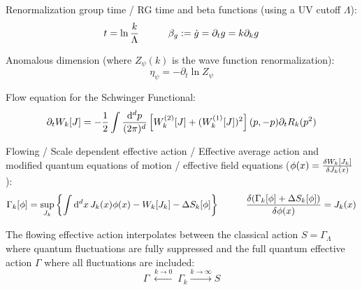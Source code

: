 		\noindent
		Renormalization group time / RG time and beta functions (using a UV cutoff $\Lambda$):
		\begin{equation}
			t = \ln \frac{k}{\Lambda}
			\hspace{30pt} \beta_g := \dot{g} = \partial_t g = k \partial_k g
		\end{equation}

		\noindent
		Anomalous dimension (where $Z_\psi(k)$ is the wave function renormalization):
		\begin{equation}
			\eta_\psi = -\partial_t \ln Z_\psi
		\end{equation}

		\noindent
		Flow equation for the Schwinger Functional:
		\begin{equation}
			\partial_t W_k[J] = -\frac{1}{2}\int \frac{\dd^d p}{(2\pi)^d} \, \qty[W^{(2)}_k[J]+(W_k^{(1)}[J])^2](p,-p) \partial_t R_k(p^2)
		\end{equation}

		\noindent
		Flowing / Scale dependent effective action / Effective average action and modified quantum equations of motion / effective field equations ($\phi(x)= \fdv{W_k[J_k]}{J_k(x)}$):
		\begin{equation}
			\Gamma_k[\phi] = \sup_{J_k} \qty{\int \dd^d x\, J_k(x) \phi(x) - W_k[J_k] - \Delta S_k[\phi]}
			\hsp \fdv{(\Gamma_k[\phi] + \Delta S_k[\phi])}{\phi(x)} = J_k(x)
		\end{equation}

		\noindent
		The flowing effective action interpolates between the classical action $S = \Gamma_\Lambda$ where quantum fluctuations are fully suppressed and the full quantum effective action $\Gamma$ where all fluctuations are included:
		\begin{equation}
			\Gamma \;\stackrel{k \to 0}{\longleftarrow}\; \Gamma_{k} \stackrel{k \to \infty}{\longrightarrow} S
		\end{equation}

